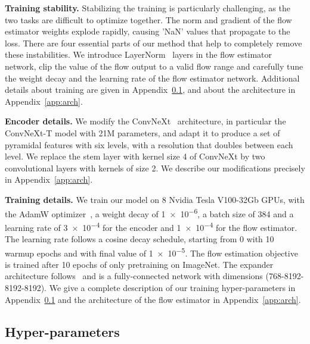 \noindent\textbf{Training stability.} Stabilizing the training is particularly challenging, as the two tasks are difficult to optimize together. The norm and gradient of the flow estimator weights explode rapidly, causing 'NaN' values that propagate to the loss. There are four essential parts of our method that help to completely remove these instabilities. We introduce LayerNorm~\cite{ba2016layernorm} layers in the flow estimator network, clip the value of the flow output to a valid flow range and carefully tune the weight decay and the learning rate of the flow estimator network. Additional details about training are given in Appendix~\ref{app:hyper}, and about the architecture in Appendix~\ref{app:arch}.
\parspace

\noindent\textbf{Encoder details.} We modify the ConvNeXt~\cite{liu2022convnext} architecture, in particular the ConvNeXt-T model with 21M parameters, and adapt it to produce a set of pyramidal features with six levels, with a resolution that doubles between each level. We replace the stem layer with kernel size 4 of ConvNeXt by two convolutional layers with kernels of size 2. We describe our modifications precisely in Appendix~\ref{app:arch}.
\parspace

\noindent\textbf{Training details.} We train our model on 8 Nvidia Tesla V100-32Gb GPUs, with the AdamW optimizer~\cite{loshchilov2019adamw}, a weight decay of \num{1e-6}, a batch size of 384 and a learning rate of \num{3e-4} for the encoder and \num{1e-4} for the flow estimator. The learning rate follows a cosine decay schedule, starting from 0 with 10 warmup epochs and with final value of \num{1e-5}. The flow estimation objective is trained after 10 epochs of only pretraining on ImageNet. The expander architecture follows~\cite{bardes2022vicreg} and is a fully-connected network with dimensions (768-8192-8192-8192). We give a complete description of our training hyper-parameters in Appendix~\ref{app:hyper} and the architecture of the flow estimator in Appendix~\ref{app:arch}.




\subsection{Hyper-parameters} \label{app:hyper}


